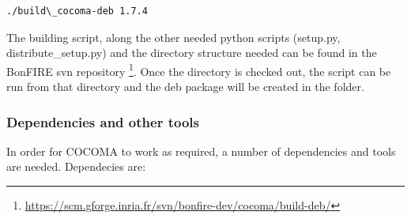 \documentclass[letterpaper,10pt,english]{sphinxhowto}
\begin{document}
\begin{Verbatim}[commandchars=\\\{\}]
./build\_cocoma-deb 1.7.4
\end{Verbatim}

The building script, along the other needed python scripts (setup.py, distribute\_setup.py) and the directory structure needed can be found in the BonFIRE svn repository \footnote{
\href{https://scm.gforge.inria.fr/svn/bonfire-dev/cocoma/build-deb/}{https://scm.gforge.inria.fr/svn/bonfire-dev/cocoma/build-deb/}
}. Once the directory is checked out, the script can be run from that directory and the deb package will be created in the  folder.


\subsubsection{Dependencies and other tools}
\label{COCOMA/10_implementation_details:dependencies-and-other-tools}
In order for COCOMA to work as required, a number of dependencies and tools are needed. Dependecies are:
\end{document}
